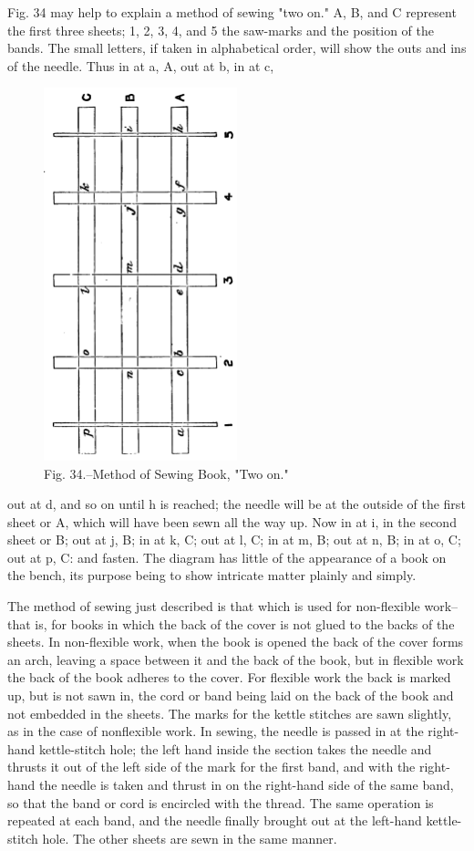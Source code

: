 \documentclass[twoside]{book}
\begin{document}
Fig. 34 may help to explain a method of sewing
"two on." A, B, and C represent the first three
\pagebreak
sheets; 1, 2, 3, 4, and 5 the saw-marks and the
position of the bands. The small letters, if taken
in alphabetical order, will show the outs and ins
of the needle. Thus in at a, A, out at b, in at c,
	\begin{figure}[h]
		\centering
		\includegraphics[width=0.5\textwidth]{Figures/_034-Rotated.png}
		\caption*{Fig. 34.--Method of Sewing Book, "Two on."}
	\end{figure}
out at d, and so on until h is reached; the needle
will be at the outside of the first sheet or A, which
will have been sewn all the way up. Now in at i,
in the second sheet or B; out at j, B; in at k, C;
\pagebreak
out at l, C; in at m, B; out at n, B; in at o, C;
out at p, C: and fasten. The diagram has little of
the appearance of a book on the bench, its purpose
being to show intricate matter plainly and
simply.

The method of sewing just described is that
which is used for non-flexible work--that is, for
books in which the back of the cover is not glued
to the backs of the sheets. In non-flexible work,
when the book is opened the back of the cover forms
an arch, leaving a space between it and the
back of the book, but in flexible work the back of
the book adheres to the cover. For flexible work
the back is marked up, but is not sawn in, the cord
or band being laid on the back of the book and not
embedded in the sheets. The marks for the kettle
stitches are sawn slightly, as in the case of
nonflexible work. In sewing, the needle is passed in
at the right-hand kettle-stitch hole; the left hand
inside the section takes the needle and thrusts it
out of the left side of the mark for the first band,
and with the right-hand the needle is taken and
thrust in on the right-hand side of the same band, so
that the band or cord is encircled with the thread.
The same operation is repeated at each band, and
the needle finally brought out at the left-hand
kettle-stitch hole. The other sheets are sewn in
the same manner.
\end{document}
